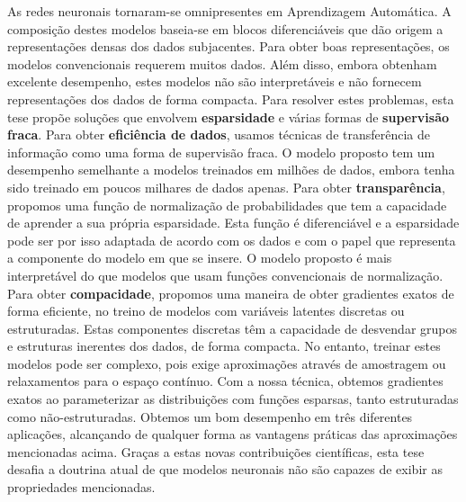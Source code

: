 \begin{resumo}

    As redes neuronais tornaram-se omnipresentes em Aprendizagem
    Automática. A composição destes modelos baseia-se em blocos
    diferenciáveis que dão origem a representações densas dos dados
    subjacentes. Para obter boas representações, os modelos
    convencionais requerem muitos dados. Além disso, embora obtenham
    excelente desempenho, estes modelos não são interpretáveis e não
    fornecem representações dos dados de forma compacta. Para
    resolver estes problemas, esta tese propõe soluções que envolvem
    \textbf{esparsidade} e várias formas de \textbf{supervisão
        fraca}. Para obter \textbf{eficiência de dados}, usamos técnicas
    de transferência de informação como uma forma de supervisão
    fraca. O modelo proposto tem um desempenho semelhante a modelos
    treinados em milhões de dados, embora tenha sido treinado em
    poucos milhares de dados apenas. Para obter
    \textbf{transparência}, propomos uma função de normalização de
    probabilidades que tem a capacidade de aprender a sua própria
    esparsidade. Esta função é diferenciável e a esparsidade pode ser
    por isso adaptada de acordo com os dados e com o papel que
    representa a componente do modelo em que se insere. O modelo
    proposto é mais interpretável do que modelos que usam funções
    convencionais de normalização. Para obter \textbf{compacidade},
    propomos uma maneira de obter gradientes exatos de forma
    eficiente, no treino de modelos com variáveis latentes discretas
    ou estruturadas. Estas componentes discretas têm a capacidade de
    desvendar grupos e estruturas inerentes dos dados, de forma
    compacta. No entanto, treinar estes modelos pode ser complexo,
    pois exige aproximações através de amostragem ou relaxamentos
    para o espaço contínuo. Com a nossa técnica, obtemos gradientes
    exatos ao parameterizar as distribuições com funções esparsas,
    tanto estruturadas como não-estruturadas. Obtemos um bom
    desempenho em três diferentes aplicações, alcançando de qualquer
    forma as vantagens práticas das aproximações mencionadas acima.
    Graças a estas novas contribuições científicas, esta tese desafia
    a doutrina atual de que modelos neuronais não são capazes de
    exibir as propriedades mencionadas.



\end{resumo}

